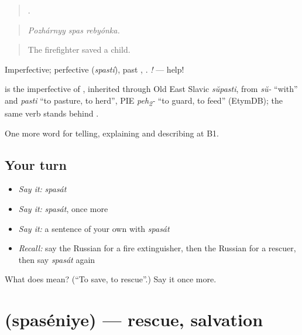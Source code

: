 \begin{quote}
  .
\end{quote}

\begin{quote}
\emph{Pozhárnyy spas rebyónka.}
\end{quote}

\begin{quote}
The firefighter saved a child.
\end{quote}

Imperfective; perfective \emph{} (\emph{spastí}), past \emph{}, \emph{}. \emph{!} — help!

\begin{cousinweb}
\emph{} is the imperfective of \emph{}, inherited through Old East Slavic \emph{sŭpasti}, from \emph{sŭ-} \textquotedblleft{}with\textquotedblright{} and \emph{pasti} \textquotedblleft{}to pasture, to herd\textquotedblright{}, PIE \emph{peh\textsubscript{2}-} \textquotedblleft{}to guard, to feed\textquotedblright{} (EtymDB); the same verb stands behind \emph{}.
\end{cousinweb}

\begin{grammarlens}[title={What you've built}]
One more word for telling, explaining and describing at B1.
\end{grammarlens}

\subsection*{Your turn}
\begin{itemize}
\raggedright
  \item \emph{Say it:} \emph{spasát}
  \item \emph{Say it:} \emph{spasát}, once more
  \item \emph{Say it:} a sentence of your own with \emph{spasát}
  \item \emph{Recall:} say the Russian for a fire extinguisher, then the Russian for a rescuer, then say \emph{spasát} again
\end{itemize}

\begin{tcolorbox}[breakable,colback=teal!4,colframe=teal!35!black,title={Before you move on}]
What does  mean? (\textquotedblleft{}To save, to rescue\textquotedblright{}.) Say it once more.
\end{tcolorbox}
\section[\texorpdfstring{\ru{спасение} (spaséniye)}{спасение (spaséniye)}]{ (spaséniye) — rescue, salvation}

